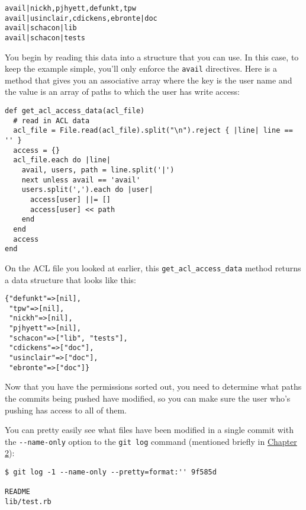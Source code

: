 \documentclass[a4paper]{book}
\newcommand{\prechap}{Chapter }
\newcommand{\postchap}{}
\newcommand{\chapref}[1]{\hyperref[chap:#1]{\prechap #1\postchap}}
\begin{document}
\begin{shaded}\begin{verbatim}
avail|nickh,pjhyett,defunkt,tpw
avail|usinclair,cdickens,ebronte|doc
avail|schacon|lib
avail|schacon|tests
\end{verbatim}\end{shaded}

You begin by reading this data into a structure that you can use. In this case, to keep the example simple, you'll only enforce the \texttt{avail} directives. Here is a method that gives you an associative array where the key is the user name and the value is an array of paths to which the user has write access:

\begin{shaded}\begin{verbatim}
def get_acl_access_data(acl_file)
  # read in ACL data
  acl_file = File.read(acl_file).split("\n").reject { |line| line == '' }
  access = {}
  acl_file.each do |line|
    avail, users, path = line.split('|')
    next unless avail == 'avail'
    users.split(',').each do |user|
      access[user] ||= []
      access[user] << path
    end
  end
  access
end
\end{verbatim}\end{shaded}

On the ACL file you looked at earlier, this \texttt{get\_acl\_access\_data} method returns a data structure that looks like this:

\begin{shaded}\begin{verbatim}
{"defunkt"=>[nil],
 "tpw"=>[nil],
 "nickh"=>[nil],
 "pjhyett"=>[nil],
 "schacon"=>["lib", "tests"],
 "cdickens"=>["doc"],
 "usinclair"=>["doc"],
 "ebronte"=>["doc"]}
\end{verbatim}\end{shaded}

Now that you have the permissions sorted out, you need to determine what paths the commits being pushed have modified, so you can make sure the user who's pushing has access to all of them.

You can pretty easily see what files have been modified in a single commit with the \texttt{-{}-name-only} option to the \texttt{git log} command (mentioned briefly in \chapref{2}):

\begin{shaded}\begin{verbatim}
$ git log -1 --name-only --pretty=format:'' 9f585d

README
lib/test.rb
\end{verbatim}\end{shaded}
\end{document}
